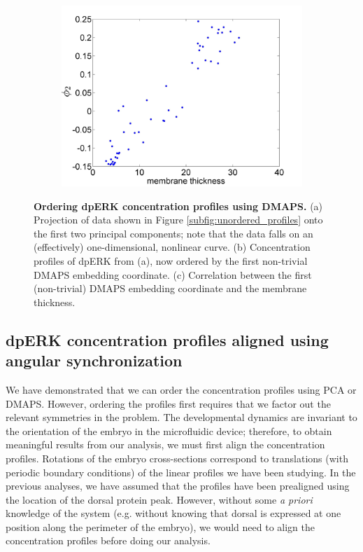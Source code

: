 \documentclass[10pt]{article}
\begin{document}
\begin{figure}[!ht]
\begin{subfigure}{0.3\textwidth}
\includegraphics[width=\textwidth]{DMAPS_time_corr}
\caption{}
\end{subfigure}
\caption{{\bf Ordering dpERK concentration profiles using DMAPS.} (a) Projection of data shown in Figure \ref{subfig:unordered_profiles} onto the first two principal components; note that the data falls on an (effectively) one-dimensional, nonlinear curve. 
(b) Concentration profiles of dpERK from (a), now ordered by the first non-trivial DMAPS embedding coordinate.
(c) Correlation between the first (non-trivial) DMAPS embedding coordinate and the membrane thickness.}
\label{fig:DMAPS_ordering}
\end{figure}

\subsection*{dpERK concentration profiles aligned using angular synchronization}

We have demonstrated that we can order the concentration profiles using PCA or DMAPS.
%
However, ordering the profiles first requires that we factor out the relevant symmetries in the problem.
%
The developmental dynamics are invariant to the orientation of the embryo in the microfluidic device; therefore, to obtain meaningful results from our analysis, we must first align the concentration profiles.
%
Rotations of the embryo cross-sections correspond to translations (with periodic boundary conditions) of the linear profiles we have been studying.
%
In the previous analyses, we have assumed that the profiles have been prealigned using the location of the dorsal protein peak.
%
However, without some {\em a priori} knowledge of the system (e.g. without knowing that dorsal is expressed at one position along the perimeter of the embryo), we would need to align the concentration profiles before doing our analysis.
\end{document}
